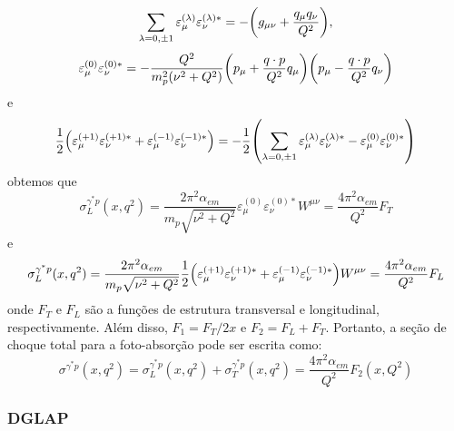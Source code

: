 \begin{equation}
    \sum_{\lambda=0,\pm 1} \varepsilon^{(\lambda)}_\mu \varepsilon^{(\lambda)*}_\nu  = - \qty(g_{\mu\nu} + \frac{q_{\mu}q_{\nu}}{Q^2}),
\end{equation}
\begin{equation}
    \varepsilon^{(0)}_\mu \varepsilon^{(0)*}_\nu  = - \frac{Q^2}{m_p^2(\nu^2 +Q^2)}\qty(p_{\mu} + \frac{q\cdot p}{Q^2}q_\mu)\qty(p_{\mu} - \frac{q\cdot p}{Q^2}q_\nu)
\end{equation}
e
\begin{equation}
    \frac{1}{2} \qty(\varepsilon^{(+1)}_\mu \varepsilon^{(+1)*}_\nu + \varepsilon^{(-1)}_\mu \varepsilon^{(-1)*}_\nu)  = - \frac{1}{2}\qty(\sum_{\lambda=0,\pm 1} \varepsilon^{(\lambda)}_\mu \varepsilon^{(\lambda)*}_\nu -   \varepsilon^{(0)}_\mu \varepsilon^{(0)*}_\nu)
\end{equation}
obtemos que
\begin{equation}
    \sigma ^{\gamma^* p}_L (x, q^2) = \frac{2\pi^2 \alpha_{em}}{m_p\sqrt{\nu^2 + Q^2}} \varepsilon^{(0)}_\mu \varepsilon_\nu^{(0)*} W^{\mu\nu} = \frac{4\pi^2\alpha_{em}}{Q^2}F_T
\end{equation}
e
\begin{equation}
    \sigma ^{\gamma^* p}_L (x, q^2) = \frac{2\pi^2 \alpha_{em}}{m_p\sqrt{\nu^2 + Q^2}} \frac{1}{2}\qty(\varepsilon^{(+1)}_\mu \varepsilon_\nu^{(+1)*} + \varepsilon^{(-1)}_\mu \varepsilon_\nu^{(-1)*} ) W^{\mu\nu} = \frac{4\pi^2\alpha_{em}}{Q^2}F_L
\end{equation}
onde $F_T$ e $F_L$ são a funções de estrutura transversal e longitudinal, respectivamente.  Além disso, $F_1 = F_T/2x$  e $F_2 = F_L + F_T$. Portanto, a seção de choque total para a foto-absorção pode ser escrita como:
\begin{equation}
    \sigma ^{\gamma^* p} (x, q^2)  =   \sigma ^{\gamma^* p}_L (x, q^2)  +  \sigma ^{\gamma^* p}_T (x, q^2)  = \frac{4\pi ^2\alpha_ {em}}{Q^2}F_ 2(x, Q^2)
\end{equation}
\subsubsection{DGLAP}


